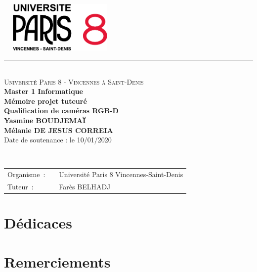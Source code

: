 \documentclass[a4paper, 12pt]{book}
\begin{document}
\begin{titlepage}
  \begin{center}
      \includegraphics[height=2.5cm, width=6cm]{images/paris8Logo.png}
    \small 
    \rule{\textwidth}{.5pt}~\\
    \large 
    \textsc{Université Paris 8 - Vincennes à Saint-Denis}\vspace{0.5cm}\\
    \textbf{Master 1 Informatique}\vspace{3.0cm}\\
    \Large
    \textbf{Mémoire projet tuteuré}\\
    \textbf{Qualification de caméras RGB-D}\vspace{1.5cm}\\
    
    \large
    \textbf{Yasmine BOUDJEMAÏ}\\
\textbf{Mélanie DE JESUS CORREIA}\vspace{1.5cm}\\
    Date de soutenance : le 10/01/2020\\
  \end{center}\vspace{3.5cm}~\\
  \begin{tabular}{ll}
    \hspace{-0.45cm}Organisme~:~&~Université Paris 8 Vincennes-Saint-Denis\\
    \hspace{-0.45cm}Tuteur~:~&~Farès  \textsc{BELHADJ}\\
  \end{tabular}
\end{titlepage}
\frontmatter



\chapter*{Dédicaces}


\chapter*{Remerciements}
\end{document}
